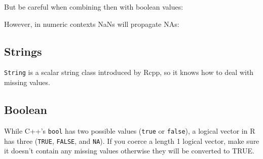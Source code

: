 \begin{Shaded}
\begin{Highlighting}[]
\NormalTok{(}\NormalTok{)}
\NormalTok{(}\NormalTok{)}
\NormalTok{(}\NormalTok{)}
\NormalTok{(}\NormalTok{)}
\end{Highlighting}
\end{Shaded}

But be careful when combining then with boolean values:

\begin{Shaded}
\begin{Highlighting}[]
\NormalTok{(}\NormalTok{)}
\NormalTok{(}\NormalTok{)}
\end{Highlighting}
\end{Shaded}

However, in numeric contexts NaNs will propagate NAs:

\begin{Shaded}
\begin{Highlighting}[]
\NormalTok{(}\NormalTok{)}
\NormalTok{(}\NormalTok{)}
\NormalTok{(}\NormalTok{)}
\NormalTok{(}\NormalTok{)}
\end{Highlighting}
\end{Shaded}

\subsection{Strings}

\texttt{String} is a scalar string class introduced by Rcpp, so it knows
how to deal with missing values.

\subsection{Boolean}

While C++'s \texttt{bool} has two possible values (\texttt{true} or
\texttt{false}), a logical vector in R has three (\texttt{TRUE},
\texttt{FALSE}, and \texttt{NA}). If you coerce a length 1 logical
vector, make sure it doesn't contain any missing values otherwise they
will be converted to TRUE.

